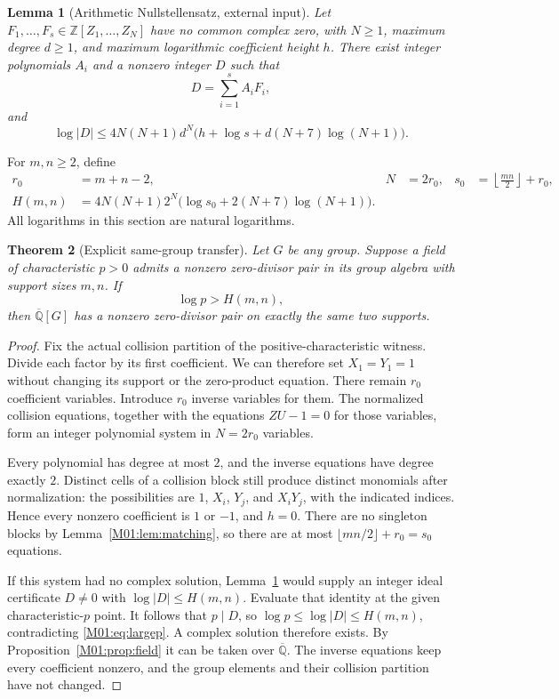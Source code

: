 \documentclass[11pt,a4paper,oneside]{report}
\newtheorem{theorem}{Theorem}[section]
\newtheorem{lemma}[theorem]{Lemma}
\theoremstyle{definition}
\theoremstyle{remark}
\newcommand{\Qbar}{\overline{\mathbb Q}}
\newcommand{\Z}{\mathbb Z}
\begin{document}
\begin{lemma}[Arithmetic Nullstellensatz, external input]\label{M01:lem:kps}
Let $F_1,\ldots,F_s\in\Z[Z_1,\ldots,Z_N]$ have no common complex
zero, with $N\ge1$, maximum degree $d\ge1$, and maximum logarithmic coefficient height
$h$. There exist integer polynomials $A_i$ and a nonzero integer $D$
such that
\[
D=\sum_{i=1}^s A_iF_i,
\]
and
\[
\log|D|\le 4N(N+1)d^N
\bigl(h+\log s+d(N+7)\log(N+1)\bigr).
\]
\end{lemma}

For $m,n\ge2$, define
\begin{align}
r_0&=m+n-2,& N&=2r_0,&s_0&=\left\lfloor\frac{mn}{2}\right\rfloor+r_0,
\label{M01:eq:params}\\
H(m,n)&=4N(N+1)2^N
\bigl(\log s_0+2(N+7)\log(N+1)\bigr).
\label{M01:eq:threshold}
\end{align}
All logarithms in this section are natural logarithms.

\begin{theorem}[Explicit same-group transfer]\label{M01:thm:effective}
Let $G$ be any group. Suppose a field of characteristic $p>0$ admits
a nonzero zero-divisor pair in its group algebra with support sizes $m,n$.
If
\begin{equation}\label{M01:eq:largep}
\log p>H(m,n),
\end{equation}
then $\Qbar[G]$ has a nonzero zero-divisor pair on exactly the same
two supports.
\end{theorem}
\begin{proof}
Fix the actual collision partition of the positive-characteristic witness.
Divide each factor by its first coefficient. We can therefore set
$X_1=Y_1=1$ without changing its support or the zero-product equation.
There remain $r_0$ coefficient variables. Introduce $r_0$ inverse
variables for them. The normalized collision equations, together with
the equations $ZU-1=0$ for those variables, form an integer polynomial
system in $N=2r_0$ variables.

Every polynomial has degree at most $2$, and the inverse equations have
degree exactly $2$. Distinct cells of a collision block still produce
distinct monomials after normalization: the possibilities are $1$,
$X_i$, $Y_j$, and $X_iY_j$, with the indicated indices. Hence every
nonzero coefficient is $1$ or $-1$, and $h=0$. There are no singleton
blocks by Lemma~\ref{M01:lem:matching}, so there are at most
$\lfloor mn/2\rfloor+r_0=s_0$ equations.

If this system had no complex solution, Lemma~\ref{M01:lem:kps} would supply
an integer ideal certificate $D\ne0$ with $\log|D|\le H(m,n)$.
Evaluate that identity at the given characteristic-$p$ point. It follows
that $p\mid D$, so $\log p\le\log|D|\le H(m,n)$, contradicting
\eqref{M01:eq:largep}. A complex solution therefore exists. By
Proposition~\ref{M01:prop:field} it can be taken over $\Qbar$. The inverse
equations keep every coefficient nonzero, and the group elements and
their collision partition have not changed.
\end{proof}
\end{document}

